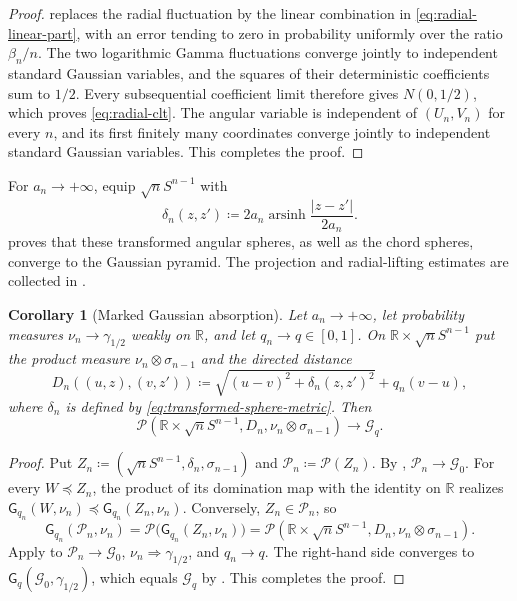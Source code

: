 \documentclass{amsart}
\numberwithin{equation}{section}
\theoremstyle{plain}
\newtheorem{corollary}[theorem]{Corollary}
\theoremstyle{definition}
\theoremstyle{remark}
\newcommand{\R}{\mathbb R}
\newcommand{\Pyr}{\mathcal P}
\DeclareMathOperator{\arsinh}{arsinh}
\begin{document}
\begin{proof}
 replaces the radial fluctuation by the linear combination in \eqref{eq:radial-linear-part}, with an error tending to zero in probability uniformly over the ratio $\beta_n/n$.  The two logarithmic Gamma fluctuations converge jointly to independent standard Gaussian variables, and the squares of their deterministic coefficients sum to $1/2$.  Every subsequential coefficient limit therefore gives $N(0,1/2)$, which proves \eqref{eq:radial-clt}.  The angular variable is independent of $(U_n,V_n)$ for every $n$, and its first finitely many coordinates converge jointly to independent standard Gaussian variables.  This completes the proof.
\end{proof}

For $a_n\to+\infty$, equip $\sqrt nS^{n-1}$ with
\begin{equation}\label{eq:transformed-sphere-metric} \delta_n(z,z')\coloneqq2a_n\arsinh\frac{|z-z'|}{2a_n}. \end{equation}
 proves that these transformed angular spheres, as well as the chord spheres, converge to the Gaussian pyramid.  The projection and radial-lifting estimates are collected in .

\begin{corollary}[Marked Gaussian absorption]\label{thm:marked-gaussian-absorption}
Let $a_n\to+\infty$, let probability measures $\nu_n\longrightarrow\gamma_{1/2}$ weakly on $\R$, and let $q_n\to q\in[0,1]$.  On $\R\times\sqrt nS^{n-1}$ put the product measure $\nu_n\otimes\sigma_{n-1}$ and the directed distance
\begin{equation}\label{eq:marked-comparison-distance} D_n((u,z),(v,z')) \coloneqq\sqrt{(u-v)^2+\delta_n(z,z')^2}+q_n(v-u), \end{equation}
where $\delta_n$ is defined by \eqref{eq:transformed-sphere-metric}.  Then
\[ \Pyr(\R\times\sqrt nS^{n-1},D_n, \nu_n\otimes\sigma_{n-1}) \longrightarrow\mathcal G_q. \]
\end{corollary}

\begin{proof}
Put $Z_n\coloneqq(\sqrt nS^{n-1},\delta_n,\sigma_{n-1})$ and
$\mathcal P_n\coloneqq\Pyr(Z_n)$.  By ,
$\mathcal P_n\to\mathcal G_0$.  For every $W\preceq Z_n$, the product of its domination map with the identity on $\R$
realizes
$\mathsf G_{q_n}(W,\nu_n)\preceq\mathsf G_{q_n}(Z_n,\nu_n)$.  Conversely, $Z_n\in\mathcal P_n$, so
\[
 \mathsf G_{q_n}(\mathcal P_n,\nu_n)
 =\Pyr\bigl(\mathsf G_{q_n}(Z_n,\nu_n)\bigr)
 =\Pyr(\R\times\sqrt nS^{n-1},D_n,\nu_n\otimes\sigma_{n-1}).
\]
Apply  to
$\mathcal P_n\to\mathcal G_0$, $\nu_n\Rightarrow\gamma_{1/2}$, and $q_n\to q$.  The right-hand side converges to
$\mathsf G_q(\mathcal G_0,\gamma_{1/2})$, which equals $\mathcal G_q$ by
.  This completes the proof.
\end{proof}
\end{document}
